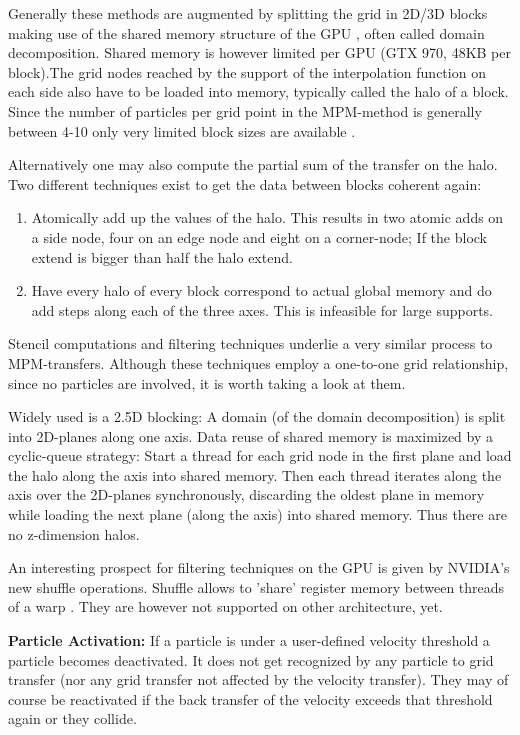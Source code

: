 \documentclass[m,times]{cgMA}
\begin{document}
Generally these methods are augmented by splitting the grid in 2D/3D blocks making use of the shared memory structure of the GPU \cite{PIC:GPU} \cite{honig2010generic} \cite{MPM:GPU}, often called domain decomposition. Shared memory is however limited per GPU (GTX 970, 48KB per block).The grid nodes reached by the support of the interpolation function on each side also have to be loaded into memory, typically called the halo of a block. Since the number of particles per grid point in the MPM-method is generally between 4-10 only very limited block sizes are available \cite{MPM:SNOW}.

Alternatively one may also compute the partial sum of the transfer on the halo. Two different techniques exist to get the data between blocks coherent again:
\begin{enumerate}
\item Atomically add up the values of the halo. This results in two atomic adds on a side node, four on an edge node and eight on a corner-node; If the block extend is bigger than half the halo extend.
\item Have every halo of every block correspond to actual global memory and do add steps along each of the three axes. This is infeasible for large supports. \cite{crassin2011interactive}
\end{enumerate}
Stencil computations and filtering techniques underlie a very similar process to MPM-transfers. Although these techniques employ a one-to-one grid relationship, since no particles are involved, it is worth taking a look at them.

Widely used is a 2.5D blocking: A domain (of the domain decomposition) is split into 2D-planes along one axis. Data reuse of shared memory is maximized by a cyclic-queue strategy: Start a thread for each grid node in the first plane and load the halo along the axis into shared memory. Then each thread iterates along the axis over the 2D-planes synchronously, discarding the oldest plane in memory while loading the next plane (along the axis) into shared memory. Thus there are no z-dimension halos. \cite{brandvik2010sblock} \cite{williams2007scientific} \cite{krotkiewski2013efficient}

An interesting prospect for filtering techniques on the GPU is given by NVI\-DIA's new shuffle operations. Shuffle allows to 'share' register memory between threads of a warp \cite{NVIDIA:SHUFFLE}. They are however not supported on other architecture, yet.

\textbf{Particle Activation:} If a particle is under a user-defined velocity threshold a particle becomes deactivated. It does not get recognized by any particle to grid transfer (nor any grid transfer not affected by the velocity transfer). They may of course be reactivated if the back transfer of the velocity exceeds that threshold again or they collide. \cite{MPM:GPU}
\end{document}
